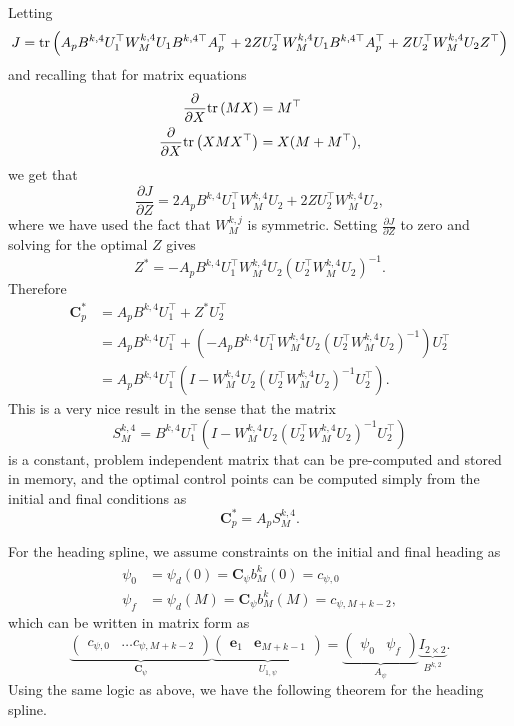 	Letting
	\[
		J = \text{tr}\left(A_p B^{k,4} U_1^\top W_M^{k,4} U_1 B^{k,4\top}A_p^\top + 2Z U_2^\top W_M^{k,4} U_1 B^{k,4\top}A_p^\top + Z U_2^\top W_M^{k,4} U_2 Z^\top\right)
	\]
	and recalling that for matrix equations
	\begin{align*}
		\frac{\partial}{\partial X}\text{tr}\left(MX\right) &= M^\top \\	
		\frac{\partial}{\partial X}\text{tr}\left(XMX^\top\right) &= X(M+M^\top),
	\end{align*}
	we get that
	\[
	\frac{\partial J}{\partial Z} = 2 A_pB^{k,4} U_1^\top W_M^{k,4} U_2 + 2 Z U_2^\top W_M^{k,4} U_2, 
	\]
	where we have used the fact that $W_M^{k,j}$ is symmetric.  Setting $\frac{\partial J}{\partial Z}$ to zero and solving for the optimal $Z$ gives
	\[
	Z^\ast = -A_p B^{k,4} U_1^\top W_M^{k,4} U_2 (U_2^\top W_M^{k,4} U_2)^{-1}.
	\]
	Therefore
	\begin{align*}
		\mathbf{C}_p^\ast 
			&= A_p B^{k,4} U_1^\top + Z^\ast U_2^\top \\	
			&= A_p B^{k,4} U_1^\top + \left(-A_p B^{k,4} U_1^\top W_M^{k,4} U_2 (U_2^\top W_M^{k,4} U_2)^{-1}\right) U_2^\top \\	
			&= A_p B^{k,4} U_1^\top \left( I - W_M^{k,4} U_2 (U_2^\top W_M^{k,4} U_2)^{-1} U_2^\top \right).	
	\end{align*}
\endproof
This is a very nice result in the sense that the matrix
\[
S_M^{k,4} = B^{k,4} U_1^\top \left(I-W_M^{k,4}U_2(U_2^\top W_M^{k,4} U_2)^{-1}U_2^\top\right)
\]
is a constant, problem independent matrix that can be pre-computed and stored in memory, and the optimal control points can be computed simply from the initial and final conditions as 
\[
\mathbf{C}_p^\ast = A_p S_M^{k,4}.
\]

For the heading spline, we assume constraints on the initial and final heading as
\begin{align*}
	\psi_0 &= \psi_d(0) = \mathbf{C}_\psi b_M^k(0) = c_{\psi,0}	\\
	\psi_f &= \psi_d(M) = \mathbf{C}_\psi b_M^k(M) = c_{\psi,M+k-2},
\end{align*}
which can be written in matrix form as
\[
	\underbrace{\begin{pmatrix}c_{\psi,0} & \dots c_{\psi,M+k-2} \end{pmatrix}}_{\mathbf{C}_\psi}
	\underbrace{\begin{pmatrix} \mathbf{e}_1 & \mathbf{e}_{M+k-1} \end{pmatrix}}_{U_{1,\psi}}
	 = 
	\underbrace{\begin{pmatrix}\psi_0 & \psi_f \end{pmatrix}}_{A_\psi}
	\underbrace{I_{2\times 2}}_{B^{k,2}}.
\]
Using the same logic as above, we have the following theorem for the heading spline.

